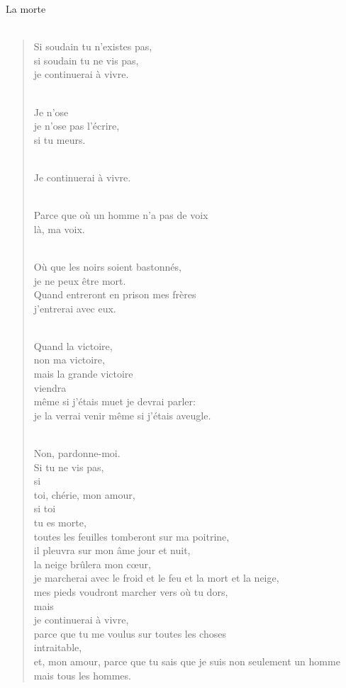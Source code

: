 \documentclass[11pt,a4paper]{book}
\begin{document}
\newpage

{\huge La morte} \\ \\

\begin{verse}
Si soudain tu n'existes pas, \\
si soudain tu ne vis pas, \\
je continuerai à vivre. \\ \

Je n'ose \\
je n'ose pas l'écrire, \\
si tu meurs. \\ \

Je continuerai à vivre. \\ \

Parce que où un homme n'a pas de voix \\
là, ma voix. \\ \

Où que les noirs soient bastonnés, \\
je ne peux être mort. \\
Quand entreront en prison mes frères \\
j'entrerai avec eux. \\ \

Quand la victoire, \\
non ma victoire, \\
mais la grande victoire \\
viendra \\
même si j'étais muet je devrai parler: \\
je la verrai venir même si j'étais aveugle. \\ \

Non, pardonne-moi. \\
Si tu ne vis pas, \\
si \\
toi, chérie, mon amour, \\
si toi \\
tu es morte, \\
toutes les feuilles tomberont sur ma poitrine, \\
il pleuvra sur mon âme jour et nuit, \\
la neige brûlera mon c{\oe}ur, \\
je marcherai avec le froid et le feu et la mort et la neige, \\
mes pieds voudront marcher vers où tu dors, \\
mais \\
je continuerai à vivre, \\
parce que tu me voulus sur toutes les choses \\
intraitable, \\
et, mon amour, parce que tu sais que je suis non seulement un homme \\
mais tous les hommes.
\end{verse}
\end{document}
